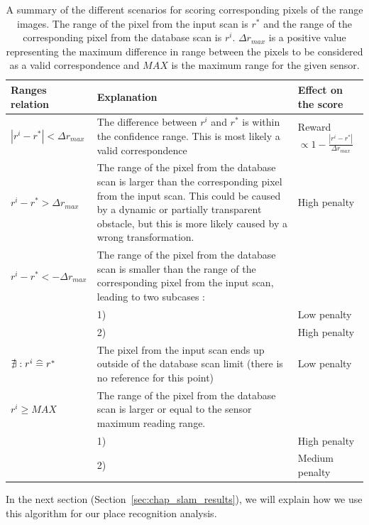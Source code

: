 \begin{table}[H]
    \centering
    \begin{tabular}{@{}p{}p{}p{}@{}}
        \toprule %
        \textbf{Ranges relation}         & \textbf{Explanation}                                                                                                    & \textbf{Effect on the score} \\
        \hline                           
        $|r^i - r^*| < \Delta r_{max}$   & The difference between $r^i$ and $r^*$ is within the confidence range. This is most likely a valid correspondence       & Reward $\propto 1-\frac{|r^i-r^*|}{\Delta r_{max}}$ \\
        $r^i - r^* > \Delta r_{max}$     & The range of the pixel from the database scan is larger than the corresponding pixel from the input scan. This could be caused by a dynamic or partially transparent obstacle, but this is more likely caused by a wrong transformation. & High penalty \\
        $r^i - r^* < -\Delta r_{max}$    & The range of the pixel from the database scan is smaller than the range of the corresponding pixel from the input scan, leading to two subcases : & \\
                                         & 1)                                                                                                                      & Low penalty \\
                                         & 2)                                                                                                                      & High penalty \\
        $\nexists : r^i \mathrel{\widehat{=}} r^*$ & The pixel from the input scan ends up outside of the database scan limit (there is no reference for this point)                  & Low penalty \\
        $r^i \ge MAX$                    & The range of the pixel from the database scan is larger or equal to the sensor maximum reading range.                   & \\
                                         & 1)                                                                                                                      & High penalty \\
                                         & 2)                                                                                                                      & Medium penalty \\
        \bottomrule
    \end{tabular}
    \caption{A summary of the different scenarios for scoring corresponding pixels of the range images. The range of the pixel from the input scan is $r^*$ and the range of the corresponding pixel from the database scan is $r^i$. $\Delta r_{max}$ is a positive value representing the maximum difference in range between the pixels to be considered as a valid correspondence and $MAX$ is the maximum range for the given sensor.}
    \label{tab:chap_slam_scoring_scenarios}
\end{table}

In the next section (Section~\ref{sec:chap_slam_results}), we will explain how we use this algorithm for our place recognition analysis.
